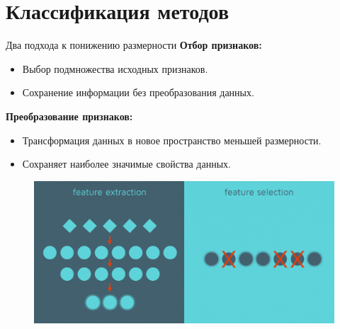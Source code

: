 \section{Классификация методов}

\begin{frame}{Два подхода к понижению размерности}
    \textbf{Отбор признаков:}
    \begin{itemize}
        \item Выбор подмножества исходных признаков.
        \item Сохранение информации без преобразования данных.
    \end{itemize}

    \textbf{Преобразование признаков:}
    \begin{itemize}
        \item Трансформация данных в новое пространство меньшей размерности.
        \item Сохраняет наиболее значимые свойства данных.
    \end{itemize}

    \begin{figure}
        \includegraphics[width=.5\textwidth]{../resources/methods/feature_selection_vs_extraction.png}
    \end{figure}
\end{frame}

